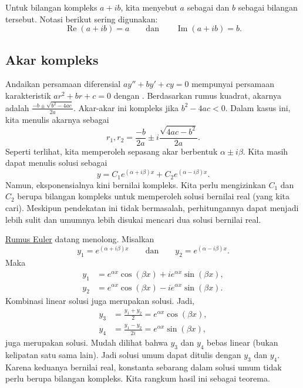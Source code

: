 Untuk bilangan kompleks $a+ib$, kita menyebut $a$ sebagai \emph{} dan $b$ sebagai \emph{} bilangan tersebut. Notasi berikut sering digunakan:
\begin{equation*}
\operatorname{Re}(a+ib) = a
\qquad \text{dan} \qquad
\operatorname{Im}(a+ib) = b.
\end{equation*}

\subsection{Akar kompleks}

Andaikan persamaan diferensial $ay'' + by' + cy = 0$ mempunyai persamaan karakteristik $a r^2 + b r + c = 0$ dengan . Berdasarkan rumus kuadrat, akarnya adalah $\frac{-b \pm \sqrt{b^2 - 4ac}}{2a}$. Akar-akar ini kompleks jika $b^2 - 4ac < 0$. Dalam kasus ini, kita menulis akarnya sebagai
\begin{equation*}
r_1, r_2 = \frac{-b}{2a} \pm i\frac{\sqrt{4ac - b^2}}{2a} .
\end{equation*}
Seperti terlihat, kita memperoleh sepasang akar berbentuk $\alpha \pm i \beta$. Kita masih dapat menulis solusi sebagai
\begin{equation*}
y = C_1 e^{(\alpha+i\beta)x} + C_2 e^{(\alpha-i\beta)x} .
\end{equation*}
Namun, eksponensialnya kini bernilai kompleks. Kita perlu mengizinkan $C_1$ dan $C_2$ berupa bilangan kompleks untuk memperoleh solusi bernilai real (yang kita cari). Meskipun pendekatan ini tidak bermasalah, perhitungannya dapat menjadi lebih sulit dan umumnya lebih disukai mencari dua solusi bernilai real.

\hyperref[eulersformula]{Rumus Euler} datang menolong. Misalkan
\begin{equation*}
y_1 = e^{(\alpha+i\beta)x} \qquad \text{dan} \qquad y_2 = e^{(\alpha-i\beta)x} .
\end{equation*}
Maka
\begin{equation*}
\begin{aligned}
y_1 & = e^{\alpha x} \cos (\beta x) + i e^{\alpha x} \sin (\beta x) , \\
y_2 & = e^{\alpha x} \cos (\beta x) - i e^{\alpha x} \sin (\beta x) .
\end{aligned}
\end{equation*}
Kombinasi linear solusi juga merupakan solusi. Jadi,
\begin{equation*}
\begin{aligned}
y_3 & = \frac{y_1 + y_2}{2} = e^{\alpha x} \cos (\beta x) , \\
y_4 & = \frac{y_1 - y_2}{2i} = e^{\alpha x} \sin (\beta x) ,
\end{aligned}
\end{equation*}
juga merupakan solusi. Mudah dilihat bahwa $y_3$ dan $y_4$ bebas linear (bukan kelipatan satu sama lain). Jadi solusi umum dapat ditulis dengan $y_3$ dan $y_4$. Karena keduanya bernilai real, konstanta sebarang dalam solusi umum tidak perlu berupa bilangan kompleks. Kita rangkum hasil ini sebagai teorema.

